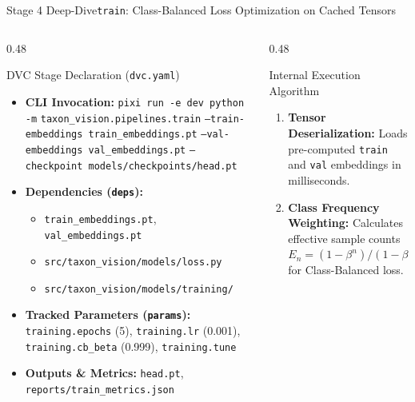 \begin{frame}{Stage 4 Deep-Dive}{\texttt{train}: Class-Balanced Loss Optimization on Cached Tensors}
\begin{columns}[T]
\begin{column}{0.48\textwidth}
\begin{block}{DVC Stage Declaration (\texttt{dvc.yaml})}
                \begin{itemize}\scriptsize
                    \item \textbf{CLI Invocation:}
                        \texttt{pixi run -e dev python -m} \newline
                        \texttt{taxon\_vision.pipelines.train} \newline
                        \texttt{--train-embeddings train\_embeddings.pt} \newline
                        \texttt{--val-embeddings val\_embeddings.pt} \newline
                        \texttt{--checkpoint models/checkpoints/head.pt}
                    \item \textbf{Dependencies (\texttt{deps}):}
                        \begin{itemize}\tiny
                            \item \texttt{train\_embeddings.pt}, \texttt{val\_embeddings.pt}
                            \item \texttt{src/taxon\_vision/models/loss.py}
                            \item \texttt{src/taxon\_vision/models/training/}
                        \end{itemize}
                    \item \textbf{Tracked Parameters (\texttt{params}):}
                        \texttt{training.epochs} (5), \texttt{training.lr} (0.001), \newline
                        \texttt{training.cb\_beta} (0.999), \texttt{training.tune}
                    \item \textbf{Outputs \& Metrics:}
                        \texttt{head.pt}, \texttt{reports/train\_metrics.json}
                \end{itemize}
            \end{block}
        \end{column}
        \begin{column}{0.48\textwidth}
            \begin{block}{Internal Execution Algorithm}
                \begin{enumerate}\scriptsize
                    \item \textbf{Tensor Deserialization:} Loads pre-computed \texttt{train} and \texttt{val} embeddings in milliseconds.
                    \item \textbf{Class Frequency Weighting:} Calculates effective sample counts $E_n = (1 - \beta^n)/(1 - \beta)$ for Class-Balanced loss.

\end{enumerate}
\end{block}
\end{column}
\end{columns}
\end{frame}
